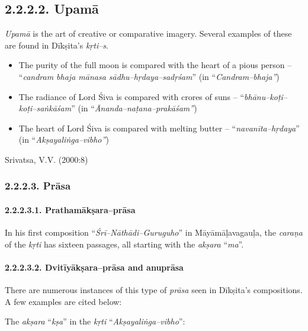 \subsection*{2.2.2.2. Upamā}

\textit{Upamā} is the art of creative or comparative imagery. Several examples of these are found in Dīkṣita’s \textit{kṛti–s}.

\begin{itemize}
\item The purity of the full moon is compared with the heart of a pious person – “\textit{candram bhaja mānasa sādhu–hṛdaya–sadṛśam}” (in “\textit{Candram–bhaja”})

 \item The radiance of Lord Śiva is compared with crores of suns – “\textit{bhānu–koṭi–koṭi–saṅkāśam}” (in “\textit{Ānanda–naṭana–prakāśam”})

 \item The heart of Lord Śiva is compared with melting butter – “\textit{navanīta–hṛdaya}” (in “\textit{Akṣayaliṅga–vibho”})

\end{itemize}

\begin{flushright}
Srivatsa, V.V. (2000:8)
\end{flushright}


\subsubsection*{2.2.2.3. Prāsa}

\paragraph*{2.2.2.3.1. Prathamākṣara–prāsa}

In his first composition “\textit{Śrī–Nāthādi–Guruguho}” in Māyāmāḷavagauḷa, the \textit{caraṇa} of the \textit{kṛti} has sixteen passages, all starting with the \textit{akṣara} “\textit{ma}”.


\paragraph*{2.2.2.3.2. Dvitīyākṣara–prāsa and anuprāsa}

There are numerous instances of this type of \textit{prāsa} seen in Dīkṣita’s compositions. A few examples are cited below:

The \textit{akṣara} “\textit{kṣa}” in the \textit{kṛti} “\textit{Akṣayaliṅga–vibho}”:

